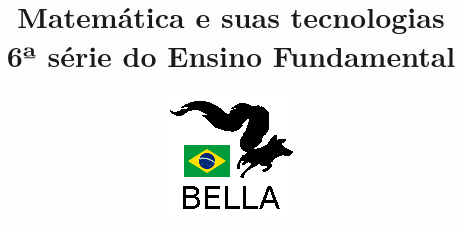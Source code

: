 \documentclass{book}
\begin{document}
\title{Matemática e suas tecnologias \\
6ª série do Ensino Fundamental}
\author{\includegraphics{../../logos/128x128-brazil.png}}

\maketitle

\tableofcontents







\end{document}
